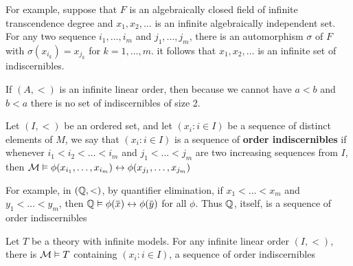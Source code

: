 \documentclass[11pt]{article}
\begin{document}
For example, suppose that \(F\) is an algebraically closed field of infinite transcendence
degree and \(x_1,x_2,\dots\) is an infinite algebraically independent set. For any two
sequence \(i_1,\dots,i_m\) and \(j_1,\dots,j_m\), there is an automorphism \(\sigma\) of \(F\)
with \(\sigma(x_{i_k})=x_{j_k}\) for \(k=1,\dots,m\). it follows that \(x_1,x_2,\dots\) is an infinite set of
indiscernibles.

If \((A,<)\) is an infinite linear order, then because we cannot have \(a<b\) and \(b<a\) there
is no set of indiscernibles of size 2.

\begin{definition}[]
Let \((I,<)\) be an ordered set, and let \((x_i:i\in I)\) be a sequence of distinct elements
of \(M\), we say that \((x_i:i\in I)\) is a sequence of \textbf{order indiscernibles} if
whenever \(i_1<i_2<\dots<i_m\) and \(j_1<\dots<j_m\) are two increasing sequences from \(I\),
then \(\mathcal{M}\vDash\phi(x_{i_1},\dots,x_{i_m})\leftrightarrow \phi(x_{j_1},\dots,x_{j_m})\)
\end{definition}

For example, in \((\mathbb{Q},<)\), by quantifier elimination, if \(x_1<\dots<x_m\) and \(y_1<\dots<y_m\), then
\(\Q\vDash\phi(\barx)\leftrightarrow\phi(\bary)\) for all \(\phi\). Thus \(\mathbb{Q}\), itself, is a sequence of order indiscernibles

\begin{theorem}[]
\label{thm5.2.3}
Let \(T\) be a theory with infinite models. For any infinite linear order \((I,<)\), there
is \(\mathcal{M}\vDash T\) containing \((x_i:i\in I)\), a sequence of order indiscernibles
\end{theorem}
\end{document}
